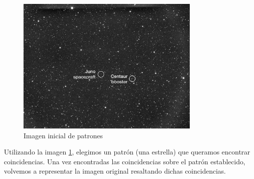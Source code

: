 \documentclass[12pt]{article}
\begin{document}
	\begin{figure}[h]
		\begin{center}
			\includegraphics[width=0.8\textwidth]{img/patrones.jpg}
			\caption{Imagen inicial de patrones}
			\label{img: patrones src}
		\end{center}
	\end{figure}

	\noindent Utilizando la imagen \ref{img: patrones src}, elegimos un patrón (una estrella) que queramos encontrar coincidencias. Una vez encontradas las coincidencias sobre el patrón establecido, volvemos a representar la imagen original resaltando dichas coincidencias.
	
\end{document}
